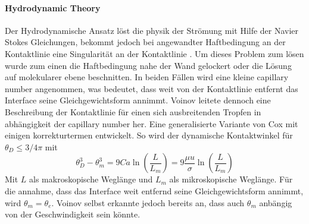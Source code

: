 \paragraph{Hydrodynamic Theory}
\label{paragraph: hydrodynTheory}
Der Hydrodynamische Ansatz löst die physik der Strömung mit Hilfe der Navier Stokes Gleichungen, bekommt jedoch bei angewandter Haftbedingung an der Kontaktlinie eine Singularität an der Kontaktlinie \cite{huh1971HydrodynamicModelSteady}. Um dieses Problem zum lösen wurde zum einen die Haftbedingung nahe der Wand gelockert oder die Lösung auf molekularer ebene beschnitten\cite{blake2006PhysicsMovingWetting}. In beiden Fällen wird eine kleine capillary number angenommen, was bedeutet, dass weit von der Kontaktlinie entfernt das Interface seine Gleichgewichtsform annimmt. 
Voinov \cite{voinovHydrodynamicsWetting1977} leitete dennoch eine Beschreibung der Kontaktlinie für einen sich ausbreitenden Tropfen in abhängigkeit der capillary number her. Eine generalisierte Variante von Cox \cite{cox1986DynamicsSpreadingLiquids} mit einigen korrekturtermen entwickelt\cite{carlsonCapillarityDynamicWetting2012,blake2006PhysicsMovingWetting}. So wird der dynamische Kontaktwinkel für $\theta_D \leq 3/4 \pi$ mit 
\begin{equation}
    \label{eq: Cox-Voinov}
    \theta_D^3-\theta_m^3= 9 Ca \ln\left(\frac{L}{L_m}\right) = 9 \frac{\mu u}{\sigma}\ln\left(\frac{L}{L_m}\right)
\end{equation}
Mit $L$ als makroskopische Weglänge und $L_m$ als mikroskopische Weglänge. Für die annahme, dass das Interface weit entfernd seine Gleichgewichtsform annimmt, wird $\theta_m = \theta_e$. Voinov selbst erkannte jedoch bereits an, dass auch $\theta_m$ anbängig von der Geschwindigkeit sein könnte\cite{voinovHydrodynamicsWetting1977,blake2006PhysicsMovingWetting}. 


